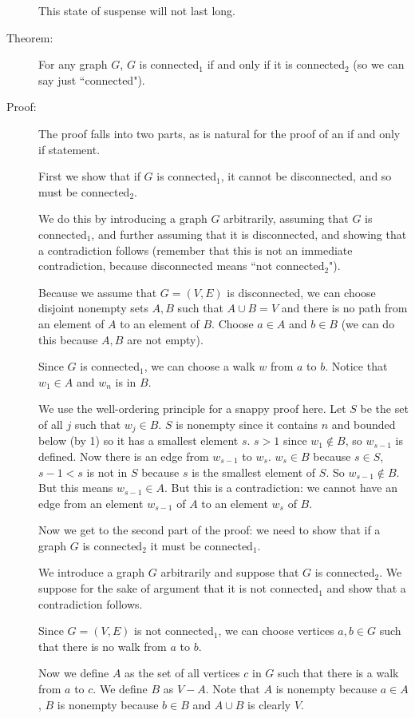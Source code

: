 \documentclass[12pt]{article}
\begin{document}
\begin{description}
This state of suspense will not last long.

\item[Theorem:]  For any graph $G$, $G$ is connected$_1$ if and only if it is connected$_2$ (so we can say just ``connected").

\item[Proof:]  The proof falls into two parts, as is natural for the proof of an if and only if statement.

First we show that if $G$ is connected$_1$, it cannot be disconnected, and so must be connected$_2$.

We do this by introducing a graph $G$ arbitrarily, assuming that $G$ is connected$_1$, and further assuming that it is disconnected, and showing that a contradiction follows (remember that this is not an immediate contradiction, because disconnected means ``not connected$_2$").

Because we assume that $G=(V,E)$ is disconnected, we can choose disjoint nonempty sets $A,B$ such that
$A \cup B = V$ and there is no path from an element of $A$ to an element of $B$.  Choose $a \in A$ and $b \in B$ (we can do this because $A,B$ are not empty).  

Since $G$ is connected$_1$, we can choose a walk $w$ from $a$ to $b$.  Notice that $w_1 \in A$ and $w_n$ is in $B$.

We use the well-ordering principle for a snappy proof here.  Let $S$ be the set of all $j$ such that
$w_j \in B$.  $S$ is nonempty since it contains $n$ and bounded below (by 1) so it has a smallest element $s$.
$s>1$ since $w_1 \not\in B$, so $w_{s-1}$ is defined.  Now there is an edge from $w_{s-1}$ to $w_s$.
$w_s \in B$ because $s \in S$,  $s-1 <s $ is not in $S$ because $s$ is the smallest element of $S$.  So $w_{s-1} \not\in B$.  But this means $w_{s-1} \in A$.  But this is a contradiction:  we cannot have an edge from an element $w_{s-1}$ of $A$ to an element $w_s$ of $B$.

Now we get to the second part of the proof:  we need to show that if a graph $G$ is connected$_2$ it must be connected$_1$.

We introduce a graph $G$ arbitrarily and suppose that $G$ is connected$_2$.  We suppose for the sake of argument that it is not connected$_1$ and show that a contradiction follows.

Since $G=(V,E)$ is not connected$_1$, we can choose vertices $a,b \in G$ such that there is no walk from $a$ to $b$.

Now we define $A$ as the set of all vertices $c$ in $G$ such that there is a walk from $a$ to $c$.  We define $B$ as
$V-A$.  Note that $A$ is nonempty because $a \in A$, $B$ is nonempty because $b \in B$ and $A \cup B$ is clearly $V$.


\end{description}
\end{document}
